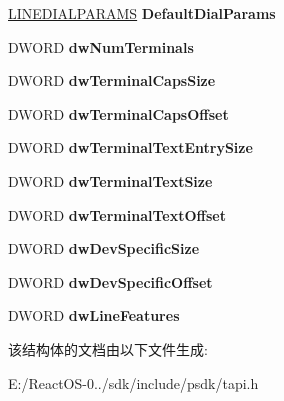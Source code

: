 \begin{DoxyCompactItemize}
\mbox{\label{structlinedevcaps__tag_a6dae6e2f26e598e4e862186a017962fb}} 
\hyperlink{structlinedialparams__tag}{L\+I\+N\+E\+D\+I\+A\+L\+P\+A\+R\+A\+MS} {\bfseries Default\+Dial\+Params}
\item 
\mbox{\label{structlinedevcaps__tag_a0e7984acb32a11cbe021a4fd38203bdd}} 
D\+W\+O\+RD {\bfseries dw\+Num\+Terminals}
\item 
\mbox{\label{structlinedevcaps__tag_aa7c0ba41dc8cd3acd1ee111b4c340871}} 
D\+W\+O\+RD {\bfseries dw\+Terminal\+Caps\+Size}
\item 
\mbox{\label{structlinedevcaps__tag_abe6eb33293a2f4e74148b84efb3deb48}} 
D\+W\+O\+RD {\bfseries dw\+Terminal\+Caps\+Offset}
\item 
\mbox{\label{structlinedevcaps__tag_a358cb8244bb0ef28e8902c2c9c9c7517}} 
D\+W\+O\+RD {\bfseries dw\+Terminal\+Text\+Entry\+Size}
\item 
\mbox{\label{structlinedevcaps__tag_aec286ab5911f3709721a1213171b6c0d}} 
D\+W\+O\+RD {\bfseries dw\+Terminal\+Text\+Size}
\item 
\mbox{\label{structlinedevcaps__tag_a165232e617cec4b458eface6eaba1873}} 
D\+W\+O\+RD {\bfseries dw\+Terminal\+Text\+Offset}
\item 
\mbox{\label{structlinedevcaps__tag_a9f1fea98201d9089958b292e41c53580}} 
D\+W\+O\+RD {\bfseries dw\+Dev\+Specific\+Size}
\item 
\mbox{\label{structlinedevcaps__tag_ac1a4f4ef17ccaf7d1a8ebe180424e0af}} 
D\+W\+O\+RD {\bfseries dw\+Dev\+Specific\+Offset}
\item 
\mbox{\label{structlinedevcaps__tag_a1724197c45be957a0ecdc6da93196917}} 
D\+W\+O\+RD {\bfseries dw\+Line\+Features}
\end{DoxyCompactItemize}


该结构体的文档由以下文件生成\+:\begin{DoxyCompactItemize}
\item 
E\+:/\+React\+O\+S-\/0../sdk/include/psdk/tapi.\+h\end{DoxyCompactItemize}
